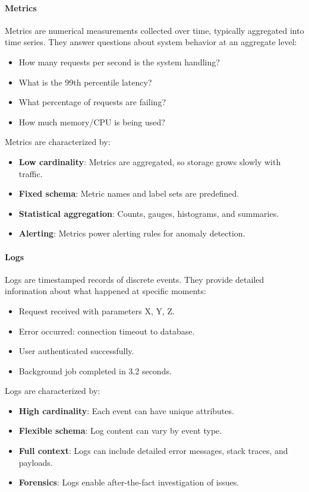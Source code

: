 \documentclass[a4paper,twoside]{sapthesis}
\begin{document}
\paragraph{Metrics}

Metrics are numerical measurements collected over time, typically aggregated into time series. They answer questions about system behavior at an aggregate level:

\begin{itemize}
    \item How many requests per second is the system handling?
    \item What is the 99th percentile latency?
    \item What percentage of requests are failing?
    \item How much memory/CPU is being used?
\end{itemize}

Metrics are characterized by:
\begin{itemize}
    \item \textbf{Low cardinality}: Metrics are aggregated, so storage grows slowly with traffic.
    \item \textbf{Fixed schema}: Metric names and label sets are predefined.
    \item \textbf{Statistical aggregation}: Counts, gauges, histograms, and summaries.
    \item \textbf{Alerting}: Metrics power alerting rules for anomaly detection.
\end{itemize}

\paragraph{Logs}

Logs are timestamped records of discrete events. They provide detailed information about what happened at specific moments:

\begin{itemize}
    \item Request received with parameters X, Y, Z.
    \item Error occurred: connection timeout to database.
    \item User authenticated successfully.
    \item Background job completed in 3.2 seconds.
\end{itemize}

Logs are characterized by:
\begin{itemize}
    \item \textbf{High cardinality}: Each event can have unique attributes.
    \item \textbf{Flexible schema}: Log content can vary by event type.
    \item \textbf{Full context}: Logs can include detailed error messages, stack traces, and payloads.
    \item \textbf{Forensics}: Logs enable after-the-fact investigation of issues.
\end{itemize}
\end{document}

